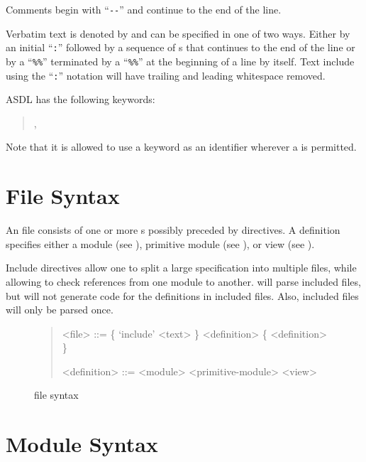 Comments begin with ``\lstinline[language=ASDL]!--!''
and continue to the end of the line.

Verbatim text is denoted by  and can be specified in one of two ways.
Either by an initial ``\lstinline!:!'' followed by a sequence of s that
continues to the end of the line or by a ``\lstinline!%%!'' terminated by a ``\lstinline!%%!''
at the beginning of a line by itself. 
Text include using the ``\lstinline!:!'' notation will have trailing and leading 
whitespace removed.

ASDL has the following keywords:
\begin{quote}
     ,
     
\end{quote}%
Note that it is allowed to use a keyword as an identifier wherever a  is permitted.

\section{File Syntax}

An \asdl{} file consists of one or more s possibly preceded by 
directives.
A definition specifies either a module (see ),
primitive module (see ),
or view (see ).

Include directives allow one to split a large \asdl{} specification into multiple files,
while allowing \asdlgen{} to check references from one module to another.
\asdlgen{} will parse included files, but will not generate code for the definitions in included
files.
Also, included files will only be parsed once.

\begin{figure}[t]
  \begin{quote}
    \begin{grammar}
      <file>  ::=  \{ `include' <text> \} <definition> \{ <definition> \}
      
      <definition> ::= <module>
        \alt{} <primitive-module>
        \alt{} <view>
    \end{grammar}
  \end{quote}
  \caption{\asdl{} file syntax}
  \label{fig:file-syntax}
\end{figure}%

\section{Module Syntax}
\label{sec:module-syntax}

